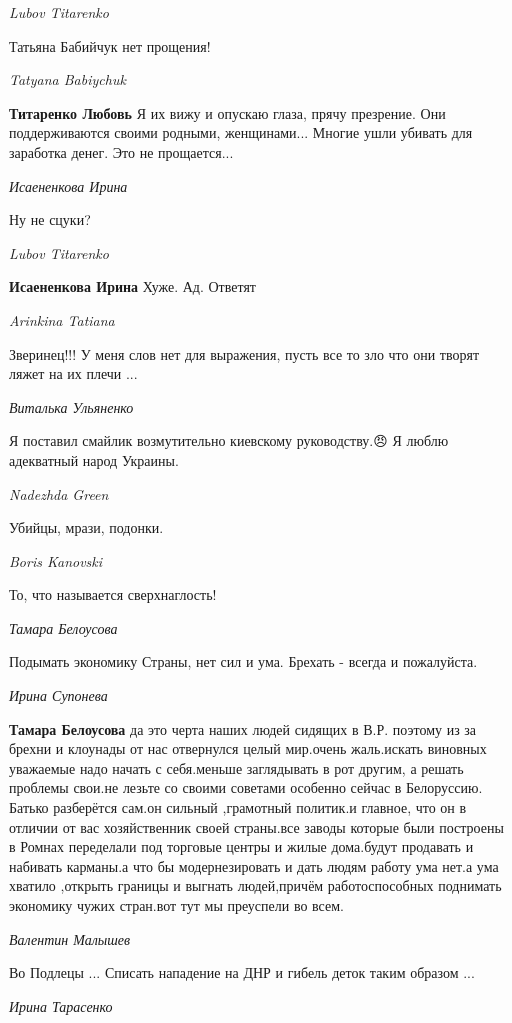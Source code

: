 \emph{Lubov Titarenko}

Татьяна Бабийчук нет прощения!

\emph{Tatyana Babiychuk}

\textbf{Титаренко Любовь} Я их вижу и опускаю глаза, прячу презрение. Они
поддерживаются своими родными, женщинами... Многие ушли убивать для заработка
денег. Это не прощается...

\emph{Исаененкова Ирина}

Ну не сцуки?

\emph{Lubov Titarenko}

\textbf{Исаененкова Ирина} Хуже. Ад. Ответят

\emph{Arinkina Tatiana}

Зверинец!!! У меня слов нет для выражения, пусть все то зло что они творят ляжет на их плечи ...

\emph{Виталька Ульяненко}

Я поставил смайлик возмутительно киевскому руководству.😠 Я люблю адекватный
народ Украины.

\emph{Nadezhda Green}

Убийцы, мрази, подонки.

\emph{Boris Kanovski}

То, что называется сверхнаглость!

\emph{Тамара Белоусова}

Подымать экономику Страны, нет сил и ума. Брехать - всегда и пожалуйста.

\emph{Ирина Супонева}

\textbf{Тамара Белоусова} да это черта наших людей сидящих в В.Р. поэтому из за брехни и
клоунады от нас отвернулся целый мир.очень жаль.искать виновных уважаемые надо
начать с себя.меньше заглядывать в рот другим, а решать проблемы свои.не лезьте
со своими советами особенно сейчас в Белоруссию. Батько разберётся сам.он
сильный ,грамотный политик.и главное, что он в отличии от вас хозяйственник
своей страны.все заводы которые были построены в Ромнах переделали под торговые
центры и жилые дома.будут продавать и набивать карманы.а что бы модернезировать
и дать людям работу ума нет.а ума хватило ,открыть границы и выгнать
людей,причём работоспособных поднимать экономику чужих стран.вот тут мы
преуспели во всем.

\emph{Валентин Малышев}

Во Подлецы ... Списать нападение на ДНР и гибель деток таким образом ...

\emph{Ирина Тарасенко}

